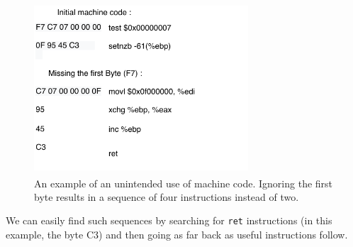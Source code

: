 \documentclass[10pt,twocolumn,a4paper]{article}
\begin{document}
\begin{figure}[h]
  \includegraphics[keepaspectratio,width=8cm]{fig/ByteCode}
  \caption{An example of an unintended use of machine code\textsuperscript{\cite{geometry}}. Ignoring the first byte results in a sequence of four instructions instead of two.}
\end{figure}
We can easily find such sequences by searching for \texttt{ret} instructions (in this example, the byte C3) and then going as far back as useful instructions follow\cite{gadgets}.
\end{document}
